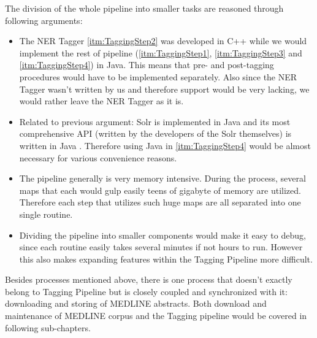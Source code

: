 The division of the whole pipeline into smaller tasks are reasoned through following arguments:
\begin{itemize}
\item The NER Tagger \ref{itm:TaggingStep2} was developed in C++ while we would implement the rest of pipeline (\ref{itm:TaggingStep1}, \ref{itm:TaggingStep3} and \ref{itm:TaggingStep4}) in Java. This means that pre- and post-tagging procedures would have to be implemented separately. Also since the NER Tagger wasn't written by us and therefore support would be very lacking, we would rather leave the NER Tagger as it is.
\item Related to previous argument: Solr is implemented in Java and its most comprehensive API (written by the developers of the Solr themselves) is written in Java \citep{grainger2014solr}. Therefore using Java in \ref{itm:TaggingStep4} would be almost necessary for various convenience reasons.
\item The pipeline generally is very memory intensive. During the process, several maps that each would gulp easily teens of gigabyte of memory are utilized. Therefore each step that utilizes such huge maps are all separated into one single routine.
\item Dividing the pipeline into smaller components would make it easy to debug, since each routine easily takes several minutes if not hours to run. However this also makes expanding features within the Tagging Pipeline more difficult.
\end{itemize}

Besides processes mentioned above, there is one process that doesn't exactly belong to Tagging Pipeline but is closely coupled and synchronized with it: downloading and storing of MEDLINE abstracts. Both download and maintenance of MEDLINE corpus and the Tagging pipeline would be covered in following sub-chapters.

